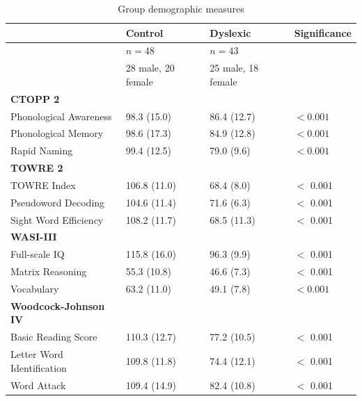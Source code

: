 \documentclass[..\uwthesis.tex]{subfiles}
\begin{document}
\begin{table}
  \begin{threeparttable}
    \caption{Group demographic measures}
    \label{tab:sb_group_demo}
    \begin{tabular}{llll}
    \toprule
      & Control & Dyslexic & Significance\\
    \midrule
     & $n=$48 & $n=$43 & \\
     & 28 male, 20 female & 25 male, 18 female & \\
    \textbf{CTOPP 2} &  &  & \\
    Phonological Awareness & 98.3 (15.0) & 86.4 (12.7) & $<0.001$\\
    Phonological Memory & 98.6 (17.3) & 84.9 (12.8) & $<0.001$\\
    Rapid Naming & 99.4 (12.5) & 79.0 (9.6) & $<0.001$\\
    \textbf{TOWRE 2} &  &  & \\
    TOWRE Index & 106.8 (11.0) & 68.4 (8.0) & $<$ 0.001\\
    Pseudoword Decoding & 104.6 (11.4) & 71.6 (6.3) & $<$ 0.001\\
    Sight Word Efficiency & 108.2 (11.7) & 68.5 (11.3) & $<$ 0.001\\
    \textbf{WASI-III} &  &  & \\
    Full-scale IQ & 115.8 (16.0) & 96.3 (9.9) & $<$ 0.001\\
    Matrix Reasoning & 55.3 (10.8) & 46.6 (7.3) & $<$ 0.001\\
    Vocabulary & 63.2 (11.0) & 49.1 (7.8) & $<0.001$\\
    \textbf{Woodcock-Johnson IV} &  &  & \\
    Basic Reading Score & 110.3 (12.7) & 77.2 (10.5) & $<$ 0.001\\
    Letter Word Identification & 109.8 (11.8) & 74.4 (12.1) & $<$ 0.001\\
    Word Attack & 109.4 (14.9) & 82.4 (10.8) & $<$ 0.001\\


    \bottomrule
\end{tabular}
    \end{threeparttable}
\end{table}
\end{document}
